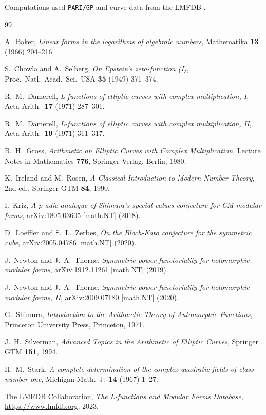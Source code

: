 \documentclass[12pt,a4paper]{article}
\theoremstyle{plain}
\theoremstyle{definition}
\begin{document}
Computations used \texttt{PARI/GP} and curve data from
the LMFDB \cite{LMFDB}.


\begin{thebibliography}{99}

A.~Baker,
\textit{Linear forms in the logarithms of algebraic numbers},
Mathematika \textbf{13} (1966) 204--216.

S.~Chowla and A.~Selberg,
\textit{On Epstein's zeta-function (I)},
Proc.\ Natl.\ Acad.\ Sci.\ USA \textbf{35} (1949) 371--374.

R.~M.~Damerell,
\textit{L-functions of elliptic curves with complex multiplication, I},
Acta Arith.\ \textbf{17} (1971) 287--301.

R.~M.~Damerell,
\textit{L-functions of elliptic curves with complex multiplication, II},
Acta Arith.\ \textbf{19} (1971) 311--317.

B.~H.~Gross,
\textit{Arithmetic on Elliptic Curves with Complex Multiplication},
Lecture Notes in Mathematics \textbf{776},
Springer-Verlag, Berlin, 1980.

K.~Ireland and M.~Rosen,
\textit{A Classical Introduction to Modern Number Theory},
2nd ed., Springer GTM \textbf{84}, 1990.

I.~Kriz,
\textit{A $p$-adic analogue of Shimura's special values conjecture for CM modular forms},
arXiv:1805.03605 [math.NT] (2018).

D.~Loeffler and S.~L.~Zerbes,
\textit{On the Bloch-Kato conjecture for the symmetric cube},
arXiv:2005.04786 [math.NT] (2020).

J.~Newton and J.~A.~Thorne,
\textit{Symmetric power functoriality for holomorphic modular forms},
arXiv:1912.11261 [math.NT] (2019).

J.~Newton and J.~A.~Thorne,
\textit{Symmetric power functoriality for holomorphic modular forms, II},
arXiv:2009.07180 [math.NT] (2020).

G.~Shimura,
\textit{Introduction to the Arithmetic Theory of Automorphic Functions},
Princeton University Press, Princeton, 1971.

J.~H.~Silverman,
\textit{Advanced Topics in the Arithmetic of Elliptic Curves},
Springer GTM \textbf{151}, 1994.

H.~M.~Stark,
\textit{A complete determination of the complex quadratic fields of class-number one},
Michigan Math.\ J.\ \textbf{14} (1967) 1--27.

The LMFDB Collaboration,
\textit{The L-functions and Modular Forms Database},
\url{https://www.lmfdb.org}, 2023.

\end{thebibliography}
\end{document}
